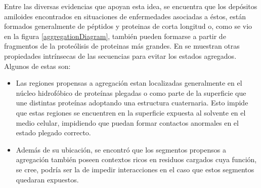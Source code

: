 Entre las diversas evidencias que apoyan esta idea, se encuentra que los depósitos amiloides encontrados en situaciones de enfermedades asociadas a éstos, 
están formados generalmente de péptidos y proteinas de corta longitud o, como se vio en la figura \ref{aggregationDiagram}, también pueden formarse a partir de fragmentos de la proteólisis de proteinas más grandes.
En \cite{knowles2014amyloid} se muestran otras propiedades intrínsecas de las secuencias para evitar los estados agregados. 
Algunos de estas son:
\begin{itemize}
 \item Las regiones propensas a agregación estan localizadas generalmente en el núcleo hidrofóbico de proteínas plegadas o como parte de la superficie que une distintas proteínas adoptando una estructura cuaternaria.
 Esto impide que estas regiones se encuentren en la superficie expuesta al solvente en el medio celular, impidiendo que puedan formar contactos anormales en el estado plegado correcto. 

\item Además de su ubicación, se encontró que los segmentos propensos a agregación también poseen contextos ricos en residuos cargados cuya función, se cree, podría ser la de impedir interacciones en el caso que 
estos segmentos quedaran expuestos.


\end{itemize}







